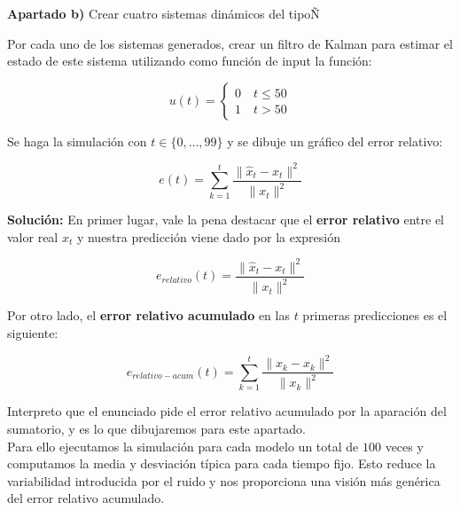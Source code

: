 \documentclass[a4paper]{article}
\begin{document}
\textbf{Apartado b)} Crear cuatro sistemas dinámicos del tipoÑ

Por cada uno de los sistemas generados, crear un filtro de Kalman para estimar el estado de este sistema utilizando como función de input la función:

\[
	u(t) = \begin{cases}
		0 \quad t \le 50 \\
		1 \quad t > 50
	\end{cases}
\]

Se haga la simulación con $t \in \{0, \ldots, 99\}$ y se dibuje un gráfico del error relativo:

\[
	e(t) = \sum_{k=1}^{t} \frac{\parallel\hat x_t - x_t\parallel^2}{\parallel x_t \parallel^2}
\]

\textbf{Solución:} En primer lugar, vale la pena destacar que el \textbf{error relativo} entre el valor real $x_t$ y nuestra predicción viene dado por la expresión

\[
	e_{relativo}(t) =\frac{\parallel\hat x_t - x_t\parallel^2}{\parallel x_t \parallel^2}
\]

Por otro lado, el \textbf{error relativo acumulado} en las $t$ primeras predicciones es el siguiente:

\[
	e_{relativo-acum}(t) = \sum_{k=1}^{t} \frac{\parallel\hat x_k - x_k\parallel^2}{\parallel x_k \parallel^2}
\]

Interpreto que el enunciado pide el error relativo acumulado por la aparación del sumatorio, y es lo que dibujaremos para este apartado. \\

Para ello ejecutamos la simulación para cada modelo un total de $100$ veces y computamos la media y desviación típica para cada tiempo fijo. Esto reduce la variabilidad introducida por el ruido y nos proporciona una visión más genérica del error relativo acumulado.
\end{document}
